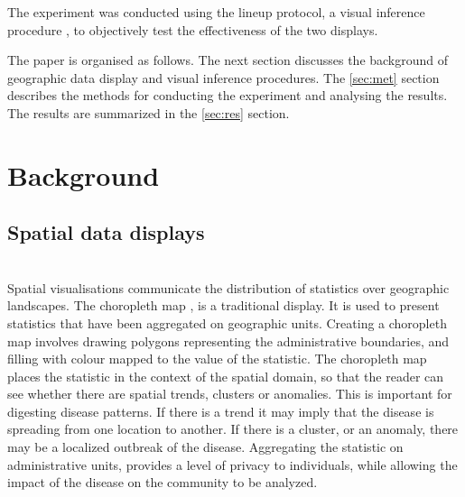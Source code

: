 \documentclass[12pt]{article}
\begin{document}
The experiment was conducted using the lineup protocol, a visual
inference procedure \citep{GIIV}, to objectively test the effectiveness
of the two displays.

The paper is organised as follows. The next section discusses the
background of geographic data display and visual inference procedures.
The \ref{sec:met} section describes the methods for conducting the
experiment and analysing the results. The results are summarized in the
\ref{sec:res} section.

\section{Background}
\label{sec:bg}

\subsection{Spatial data displays}
\label{sec:sdd}

~\\
Spatial visualisations communicate the distribution of statistics over
geographic landscapes. The choropleth map \citep{EI}, \citep{BCM} is a
traditional display. It is used to present statistics that have been
aggregated on geographic units. Creating a choropleth map involves
drawing polygons representing the administrative boundaries, and filling
with colour mapped to the value of the statistic. The choropleth map
places the statistic in the context of the spatial domain, so that the
reader can see whether there are spatial trends, clusters or anomalies.
This is important for digesting disease patterns. If there is a trend it
may imply that the disease is spreading from one location to another. If
there is a cluster, or an anomaly, there may be a localized outbreak of
the disease. Aggregating the statistic on administrative units, provides
a level of privacy to individuals, while allowing the impact of the
disease on the community to be analyzed.
\end{document}
